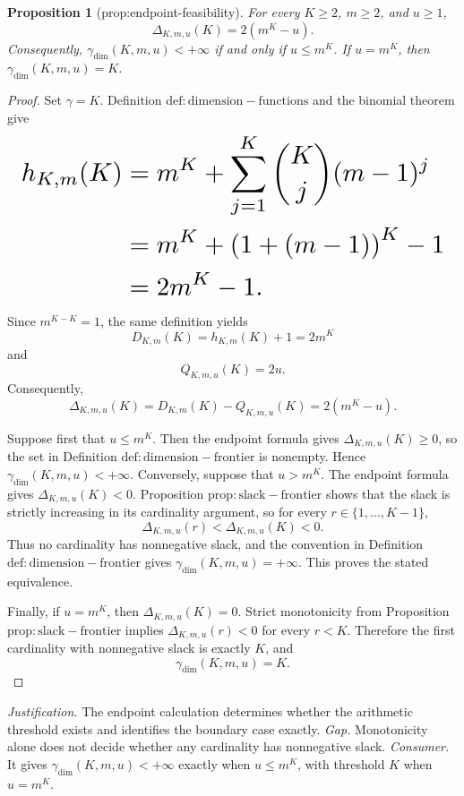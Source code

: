 \documentclass{article}
\newtheorem{proposition}{Proposition}
\begin{document}
\begin{proposition}[prop:endpoint-feasibility]\label{prop:endpoint-feasibility}
For every \(K\ge2\), \(m\ge2\), and \(u\ge1\), \[\Delta_{K,m,u}(K)=2(m^K-u).\] Consequently, \(\gamma_{\mathrm{dim}}(K,m,u)<+\infty\) if and only if \(u\le m^K\). If \(u=m^K\), then \(\gamma_{\mathrm{dim}}(K,m,u)=K\).
\end{proposition}
\begin{proof}
Set \(\gamma=K\). Definition \(\mathrm{def:dimension-functions}\) and the binomial theorem give
\[
\makebox[\linewidth][c]{\resizebox{0.98\linewidth}{!}{\(\displaystyle \begin{aligned}
h_{K,m}(K)
&=m^K+\sum_{j=1}^{K}\binom Kj(m-1)^j\\
&=m^K+\left(1+(m-1)\right)^K-1\\
&=2m^K-1.
\end{aligned}\)}}
\]
Since \(m^{K-K}=1\), the same definition yields
\[D_{K,m}(K)=h_{K,m}(K)+1=2m^K\]
and
\[Q_{K,m,u}(K)=2u.\]
Consequently,
\[\Delta_{K,m,u}(K)=D_{K,m}(K)-Q_{K,m,u}(K)=2(m^K-u).\]

Suppose first that \(u\le m^K\). Then the endpoint formula gives \(\Delta_{K,m,u}(K)\ge0\), so the set in Definition \(\mathrm{def:dimension-frontier}\) is nonempty. Hence \(\gamma_{\mathrm{dim}}(K,m,u)<+\infty\). Conversely, suppose that \(u>m^K\). The endpoint formula gives \(\Delta_{K,m,u}(K)<0\). Proposition \(\mathrm{prop:slack-frontier}\) shows that the slack is strictly increasing in its cardinality argument, so for every \(r\in\{1,\ldots,K-1\}\),
\[\Delta_{K,m,u}(r)<\Delta_{K,m,u}(K)<0.\]
Thus no cardinality has nonnegative slack, and the convention in Definition \(\mathrm{def:dimension-frontier}\) gives \(\gamma_{\mathrm{dim}}(K,m,u)=+\infty\). This proves the stated equivalence.

Finally, if \(u=m^K\), then \(\Delta_{K,m,u}(K)=0\). Strict monotonicity from Proposition \(\mathrm{prop:slack-frontier}\) implies \(\Delta_{K,m,u}(r)<0\) for every \(r<K\). Therefore the first cardinality with nonnegative slack is exactly \(K\), and
\[\gamma_{\mathrm{dim}}(K,m,u)=K.\]
\end{proof}
\par\smallskip\noindent \textit{Justification.} The endpoint calculation determines whether the arithmetic threshold exists and identifies the boundary case exactly. \textit{Gap.} Monotonicity alone does not decide whether any cardinality has nonnegative slack. \textit{Consumer.} It gives \(\gamma_{\mathrm{dim}}(K,m,u)<+\infty\) exactly when \(u\le m^K\), with threshold \(K\) when \(u=m^K\).
\end{document}
